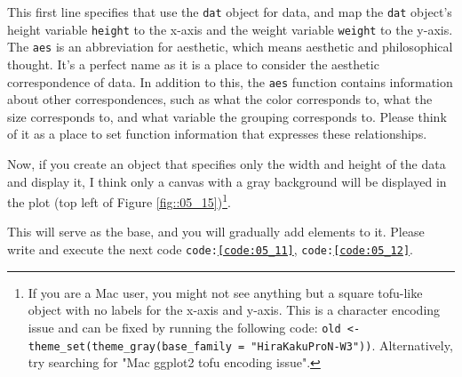 \documentclass{ltjsbook}
\begin{document}



This first line specifies that use the \texttt{dat} object for data, and map the \texttt{dat} object's height variable \verb|height| to the x-axis and the weight variable \verb|weight| to the y-axis. The \texttt{aes} is an abbreviation for aesthetic, which means aesthetic and philosophical thought. It's a perfect name as it is a place to consider the aesthetic correspondence of data. In addition to this, the \texttt{aes} function contains information about other correspondences, such as what the color corresponds to, what the size corresponds to, and what variable the grouping corresponds to. Please think of it as a place to set function information that expresses these relationships.

Now, if you create an object that specifies only the width and height of the data and display it, I think only a canvas with a gray background will be displayed in the plot (top left of Figure \ref{fig::05_15})\footnote{If you are a Mac user, you might not see anything but a square tofu-like object with no labels for the x-axis and y-axis. This is a character encoding issue and can be fixed by running the following code: \verb|old <- theme_set(theme_gray(base_family = "HiraKakuProN-W3"))|. Alternatively, try searching for "Mac ggplot2 tofu encoding issue".}.

This will serve as the base, and you will gradually add elements to it. Please write and execute the next code \texttt{code:\ref{code:05_11}}, \texttt{code:\ref{code:05_12}}.
\end{document}
